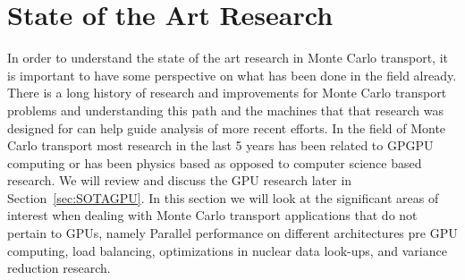 \section{ \textbf{ State of the Art Research} }

In order to understand the state of the art research in Monte Carlo transport, it is important to have some perspective on what has been done in the field already.
%
There is a long history of research and improvements for Monte Carlo transport problems and understanding this path and the machines that that research was designed for can help guide analysis of more recent efforts.
%
In the field of Monte Carlo transport most research in the last 5 years has been related to GPGPU computing or has been physics based as opposed to computer science based research.
%
We will review and discuss the GPU research later in Section~\ref{sec:SOTAGPU}.
%
In this section we will look at the significant areas of interest when dealing with Monte Carlo transport applications that do not pertain to GPUs, namely Parallel performance on different architectures pre GPU computing, load balancing, optimizations in nuclear data look-ups, and variance reduction research.
%
